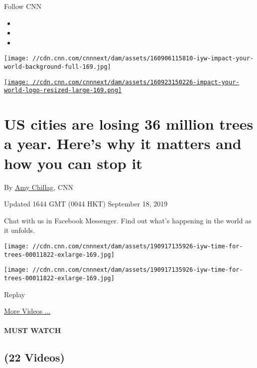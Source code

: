 Follow CNN

\begin{itemize}
\item
\item
\item
\end{itemize}

\texttt{[image: //cdn.cnn.com/cnnnext/dam/assets/160906115810-iyw-impact-your-world-background-full-169.jpg]}

\href{/specials/impact-your-world}{\texttt{[image: //cdn.cnn.com/cnnnext/dam/assets/160923150226-impact-your-world-logo-resized-large-169.png]}}

\hypertarget{us-cities-are-losing-36-million-trees-a-year-heres-why-it-matters-and-how-you-can-stop-it}{%
\section{US cities are losing 36 million trees a year. Here's why it
matters and how you can stop
it}\label{us-cities-are-losing-36-million-trees-a-year-heres-why-it-matters-and-how-you-can-stop-it}}

By \href{/profiles/amy-chillag}{Amy Chillag}, CNN

Updated 1644 GMT (0044 HKT) September 18, 2019

Chat with us in Facebook Messenger. Find out what's happening in the
world as it unfolds.

\texttt{[image: //cdn.cnn.com/cnnnext/dam/assets/190917135926-iyw-time-for-trees-00011822-exlarge-169.jpg]}

\texttt{[image: //cdn.cnn.com/cnnnext/dam/assets/190917135926-iyw-time-for-trees-00011822-exlarge-169.jpg]}\href{javascript:void(0);}{}

Replay

\href{/videos}{More Videos ...}

\hypertarget{must-watch}{%
\paragraph{MUST WATCH}\label{must-watch}}

\hypertarget{22-videos}{%
\subsection{(22 Videos)}\label{22-videos}}

\href{/videos/tv/2019/09/17/iyw-time-for-trees.cnn/video/playlists/impact-your-world/}{}

